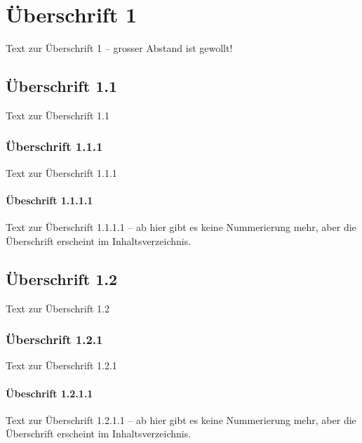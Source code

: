 \chapter{Überschrift 1}
\label{chap:chapter1}

Text zur Überschrift 1 – grosser Abstand ist gewollt!

\section{Überschrift 1.1}
\label{sec:section1}

Text zur Überschrift 1.1

\subsection{Überschrift 1.1.1}
\label{subsec:subsection1}

Text zur Überschrift 1.1.1

\subsubsection{Übeschrift 1.1.1.1}
\label{ssubsec:subsubsection1}

Text zur Überschrift 1.1.1.1 – ab hier gibt es keine Nummerierung mehr, aber die Überschrift erscheint im Inhaltsverzeichnis.

\section{Überschrift 1.2}
\label{sec:section2}

Text zur Überschrift 1.2

\subsection{Überschrift 1.2.1}
\label{subsec:subsection2}

Text zur Überschrift 1.2.1

\subsubsection{Übeschrift 1.2.1.1}
\label{ssubsec:subsubsection2}

Text zur Überschrift 1.2.1.1 – ab hier gibt es keine Nummerierung mehr, aber die Überschrift erscheint im Inhaltsverzeichnis.
